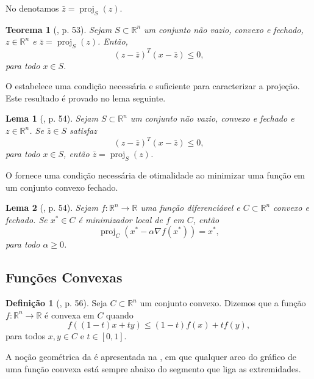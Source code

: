 \documentclass[12pt,a4paper]{scrartcl}
\DeclareMathOperator{\proj}{proj}
\def\RR{\mathds{R}}
\newtheorem{teo}{Teorema}
\newtheorem{lema}{Lema}
\theoremstyle{definition}%
\newtheorem{defi}{Definição}
\begin{document}
No  denotamos $\bar{z} = \proj_{S} (z)$.

\begin{teo} [\textcite{Ademir2013}, p. 53] \label{lema_condicaoprojecao_convexidade}
Sejam $S \subset \RR^{n}$ um conjunto não vazio, convexo e fechado, $z \in \RR^{n}$ e $\bar{z} = \proj_{S} (z)$. Então, 
\[
(z - \bar{z})^{T}(x - \bar{z}) \leq 0 ,
\]
para todo $x \in S$.
\end{teo}

O  estabelece uma condição necessária e suficiente para caracterizar a projeção. Este resultado é provado no lema seguinte.

\begin{lema} [\textcite{Ademir2013}, p. 54] \label{lema_defineprojecao_convexidade}
Sejam $S \subset \RR^{n}$ um conjunto não vazio, convexo e fechado e $z \in \RR^{n}$. Se $\bar{z} \in S$ satisfaz
\[
(z - \bar{z})^{T}(x - \bar{z}) \leq 0 ,
\]
para todo $x \in S$, então $\bar{z} = \proj_{S} (z)$.
\end{lema}

O  fornece uma condição necessária de otimalidade ao minimizar uma função em um conjunto convexo fechado.

\begin{lema} [\textcite{Ademir2013}, p. 54]
Sejam $f: \RR^{n} \longrightarrow \RR$ uma função diferenciável e $C \subset \RR^{n}$ convexo e fechado. Se $x^{*} \in C$ é minimizador local de $f$ em $C$, então
\[
\proj_{C} (x^{*} - \alpha \nabla f(x^{*})) = x^{*} ,
\]
para todo $\alpha \geq 0$.
\end{lema}

\subsection{Funções Convexas}

\begin{defi} [\textcite{Ademir2013}, p. 56] \label{defi:funcao_convexa}
Seja $C \subset \RR^{n}$ um conjunto convexo. Dizemos que a função $f: \RR^{n} \longrightarrow \RR$ é convexa em $C$ quando
\[
f((1-t)x + ty) \leq (1-t)f(x) + tf(y),
\]
para todos $x,y \in C$ e $t \in [0,1]$.
\end{defi}

A noção geométrica da  é apresentada na , em que qualquer arco do gráfico de uma função convexa está sempre abaixo do segmento que liga as extremidades.
\end{document}
